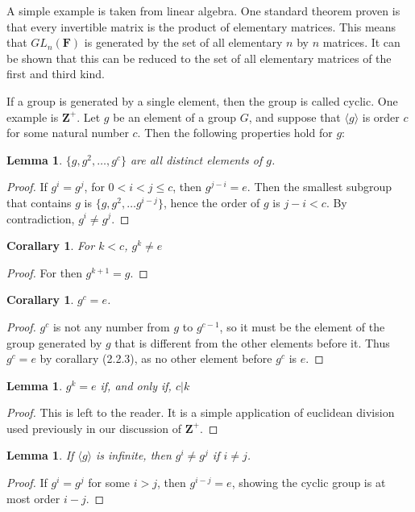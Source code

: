 \documentclass[12pt]{report}
\newtheorem{lemma}[theorem]{Lemma}
\newtheorem{corallary}[theorem]{Corallary}
\begin{document}
A simple example is taken from linear algebra. One standard theorem proven is that every invertible matrix is the product of elementary matrices. This means that $GL_n(\mathbf{F})$ is generated by the set of all elementary $n$ by $n$ matrices. It can be shown that this can be reduced to the set of all elementary matrices of the first and third kind.

If a group is generated by a single element, then the group is called cyclic. One example is $\mathbf{Z}^+$. Let $g$ be an element of a group $G$, and suppose that $\langle g \rangle$ is order $c$ for some natural number $c$. Then the following properties hold for $g$:

\begin{lemma} $\{ g, g^2, \dots, g^c \}$ are all distinct elements of $g$. \end{lemma}
\begin{proof}
    If $g^i = g^j$, for $0 < i < j \leq c$, then $g^{j-i} = e$. Then the smallest subgroup that contains $g$ is $\{ g, g^2, \dots g^{i-j} \}$,  hence the order of $g$ is $j-i < c$. By contradiction, $g^i \neq g^j$.
\end{proof}

\begin{corallary} For $k < c$, $g^k \neq e$ \end{corallary}
\begin{proof} For then $g^{k+1} = g$. \end{proof}

\begin{corallary} $g^c = e$. \end{corallary}
\begin{proof} $g^c$ is not any number from $g$ to $g^{c-1}$, so it must be the element of the group generated by $g$ that is different from the other elements before it. Thus $g^c = e$ by corallary (2.2.3), as no other element before $g^c$ is $e$. \end{proof}

\begin{lemma} $g^k = e$ if, and only if, $c|k$ \end{lemma}
\begin{proof} This is left to the reader. It is a simple application of euclidean division used previously in our discussion of $\mathbf{Z}^+$.
\end{proof}

\begin{lemma} If $\langle g \rangle$ is infinite, then $g^i \neq g^j$ if $i \neq j$. \end{lemma}
\begin{proof}
    If $g^i = g^j$ for some $i > j$, then $g^{i-j} = e$, showing the cyclic group is at most order $i - j$.
\end{proof}
\end{document}
